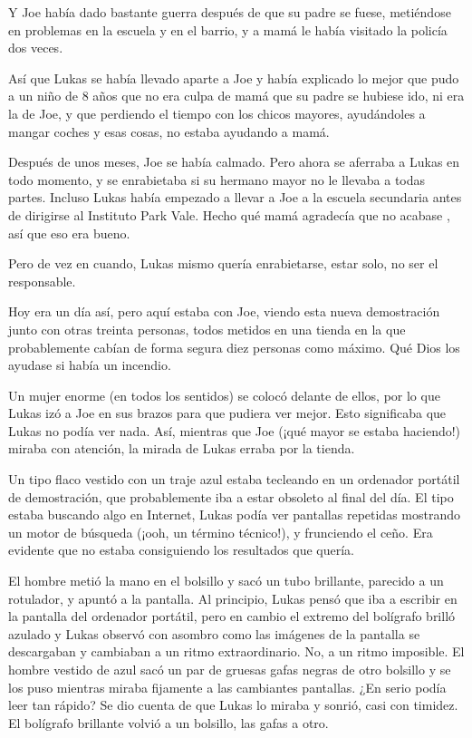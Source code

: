 Y Joe había dado bastante guerra después de que su padre se fuese,
metiéndose en problemas en la escuela y en el barrio, y a mamá le había
visitado la policía dos veces.

Así que Lukas se había llevado aparte a Joe y había explicado lo mejor
que pudo a un niño de 8 años que no era culpa de mamá que su padre se
hubiese ido, ni era la de Joe, y que perdiendo el tiempo con los chicos
mayores, ayudándoles a mangar coches y esas cosas, no estaba ayudando a
mamá.

Después de unos meses, Joe se había calmado. Pero ahora se aferraba a
Lukas en todo momento, y se enrabietaba si su hermano mayor no le
llevaba a todas partes. Incluso Lukas había empezado a llevar a Joe a la
escuela secundaria antes de dirigirse al Instituto Park Vale. Hecho qué
mamá agradecía que no acabase , así que eso era bueno.

Pero de vez en cuando, Lukas mismo quería enrabietarse, estar solo, no
ser el responsable.

Hoy era un día así, pero aquí estaba con Joe, viendo esta nueva
demostración junto con otras treinta personas, todos metidos en una
tienda en la que probablemente cabían de forma segura diez personas como
máximo. Qué Dios los ayudase si había un incendio.

Un mujer enorme (en todos los sentidos) se colocó delante de ellos, por
lo que Lukas izó a Joe en sus brazos para que pudiera ver mejor. Esto
significaba que Lukas no podía ver nada. Así, mientras que Joe (¡qué
mayor se estaba haciendo!) miraba con atención, la mirada de Lukas
erraba por la tienda.

Un tipo flaco vestido con un traje azul estaba tecleando en un ordenador
portátil de demostración, que probablemente iba a estar obsoleto al
final del día. El tipo estaba buscando algo en Internet, Lukas podía ver
pantallas repetidas mostrando un motor de búsqueda (¡ooh, un término
técnico!), y frunciendo el ceño. Era evidente que no estaba consiguiendo
los resultados que quería.

El hombre metió la mano en el bolsillo y sacó un tubo brillante,
parecido a un rotulador, y apuntó a la pantalla. Al principio, Lukas
pensó que iba a escribir en la pantalla del ordenador portátil, pero en
cambio el extremo del bolígrafo brilló azulado y Lukas observó con
asombro como las imágenes de la pantalla se descargaban y cambiaban a un
ritmo extraordinario. No, a un ritmo imposible. El hombre vestido de
azul sacó un par de gruesas gafas negras de otro bolsillo y se los puso
mientras miraba fijamente a las cambiantes pantallas. ¿En serio podía
leer tan rápido? Se dio cuenta de que Lukas lo miraba y sonrió, casi
con timidez. El bolígrafo brillante volvió a un bolsillo, las gafas a
otro.

